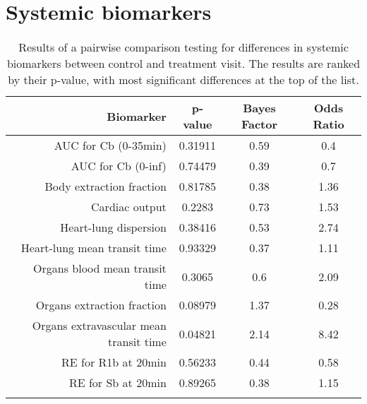 \documentclass{epflreport}%
\begin{document}
\section{Systemic biomarkers}%
\label{sec:Systemicbiomarkers}%

%
\begin{longtable}{rccc}%
\hline%
Biomarker&p{-}value&Bayes Factor&Odds Ratio\\%
\hline%
AUC for Cb (0{-}35min)&0.31911&0.59&0.4\\%
AUC for Cb (0{-}inf)&0.74479&0.39&0.7\\%
Body extraction fraction&0.81785&0.38&1.36\\%
Cardiac output&0.2283&0.73&1.53\\%
Heart{-}lung dispersion&0.38416&0.53&2.74\\%
Heart{-}lung mean transit time&0.93329&0.37&1.11\\%
Organs blood mean transit time&0.3065&0.6&2.09\\%
Organs extraction fraction&0.08979&1.37&0.28\\%
Organs extravascular mean transit time&0.04821&2.14&8.42\\%
RE for R1b at 20min&0.56233&0.44&0.58\\%
RE for Sb at 20min&0.89265&0.38&1.15\\%
\hline%
\caption{Results of a pairwise comparison testing for differences in systemic biomarkers between control and treatment visit. The results are ranked by their p-value, with most significant differences at the top of the list.} \\%
\end{longtable}%
\end{document}
